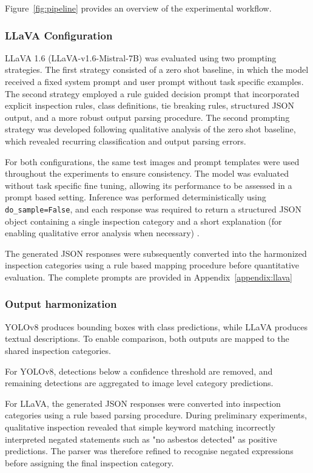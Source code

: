 Figure~\ref{fig:pipeline} provides an overview of the experimental workflow.

\subsubsection{LLaVA Configuration}

LLaVA 1.6 (LLaVA-v1.6-Mistral-7B) was evaluated using two prompting strategies\cite{liu_visual_2023}. The first strategy consisted of a zero shot baseline, in which the model received a fixed system prompt and user prompt without task specific examples. The second strategy employed a rule guided decision prompt that incorporated explicit inspection rules, class definitions, tie breaking rules, structured JSON output, and a more robust output parsing procedure. The second prompting strategy was developed following qualitative analysis of the zero shot baseline, which revealed recurring classification and output parsing errors.

For both configurations, the same test images and prompt templates were used throughout the experiments to ensure consistency. The model was evaluated without task specific fine tuning, allowing its performance to be assessed in a prompt based setting. Inference was performed deterministically using \texttt{do\_sample=False}, and each response was required to return a structured JSON object containing a single inspection category and a short explanation (for enabling qualitative error analysis when necessary) . 

The generated JSON responses were subsequently converted into the harmonized inspection categories using a rule based mapping procedure before quantitative evaluation. The complete prompts are provided in Appendix~\ref{appendix:llava}

\subsubsection{Output harmonization}

YOLOv8 produces bounding boxes with class predictions, while LLaVA produces textual descriptions. To enable comparison, both outputs are mapped to the shared inspection categories.

For YOLOv8, detections below a confidence threshold are removed, and remaining detections are aggregated to image level category predictions.

For LLaVA, the generated JSON responses were converted into inspection categories using a rule based parsing procedure. During preliminary experiments, qualitative inspection revealed that simple keyword matching incorrectly interpreted negated statements such as "no asbestos detected" as positive predictions. The parser was therefore refined to recognise negated expressions before assigning the final inspection category.

